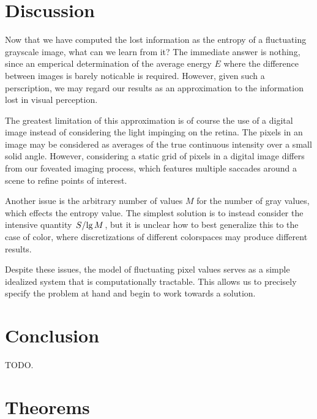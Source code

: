 \documentclass[aps,reprint]{revtex4-2}
\renewcommand\mathrm\textnormal%
\theoremstyle{plain}
\theoremstyle{definition}
\renewcommand\lg{\operatorname{\mathrm{lg}}}
\begin{document}
\section{Discussion}

Now that we have computed the lost information as the entropy of a fluctuating
grayscale image, what can we learn from it? The immediate answer is nothing,
since an emperical determination of the average energy $E$ where the difference
between images is barely noticable is required. However, given such a
perscription, we may regard our results as an approximation to the information
lost in visual perception.

The greatest limitation of this approximation is of course the use of a digital
image instead of considering the light impinging on the retina. The pixels in an
image may be considered as averages of the true continuous intensity over a
small solid angle. However, considering a static grid of pixels in a digital
image differs from our foveated imaging process, which features multiple
saccades around a scene to refine points of interest.

Another issue is the arbitrary number of values $M$ for the number of gray
values, which effects the entropy value. The simplest solution is to instead
consider the intensive quantity $\flatfrac{S}{\lg M}$, but it is unclear how to
best generalize this to the case of color, where discretizations of different
colorspaces may produce different results.

Despite these issues, the model of fluctuating pixel values serves as a simple
idealized system that is computationally tractable. This allows us to precisely
specify the problem at hand and begin to work towards a solution.

\section{Conclusion}

TODO.

\appendix

\section{Theorems}
\end{document}
